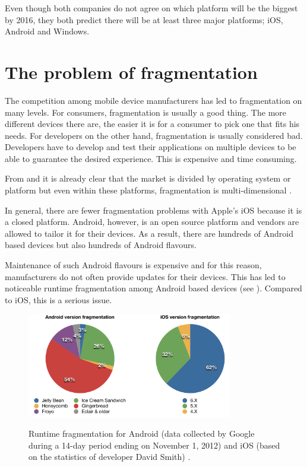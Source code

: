 \npar Even though both companies do not agree on which platform will be the biggest by 2016, they both predict there will be at least three major platforms; iOS, Android and Windows. 


\section{The problem of fragmentation}

\npar The competition among mobile device manufacturers has led to fragmentation on many levels. For consumers, fragmentation is usually a good thing. The more different devices there are, the easier it is for a consumer to pick one that fits his needs. For developers on the other hand, fragmentation is usually considered bad. Developers have to develop and test their applications on multiple devices to be able to guarantee the desired experience. This is expensive and time consuming.

\npar From  and  it is already clear that the market is divided by operating system or platform but even within these platforms, fragmentation is multi-dimensional \citep{Kindel}.

\npar In general, there are fewer fragmentation problems with Apple's iOS because it is a closed platform. Android, however, is an open source platform and vendors are allowed to tailor it for their devices. As a result, there are hundreds of Android based devices but also hundreds of Android flavours.

\npar Maintenance of such Android flavours is expensive and for this reason, manufacturers do not often provide updates for their devices. This has led to noticeable runtime fragmentation among Android based devices (see ). Compared to iOS, this is a serious issue.

\begin{figure}
    \begin{center}
        \label{fig:runtime_fragmentation}
        \includegraphics[width=0.8\textwidth]{figs/os_distribution.pdf}
        \caption{
            Runtime fragmentation for Android (data collected by Google during a 14-day period ending on November 1, 2012) \citep{android_distribution} and iOS (based on the statistics of developer David Smith) \citep{ios_distribution}.
        }
    \end{center}
\end{figure}

